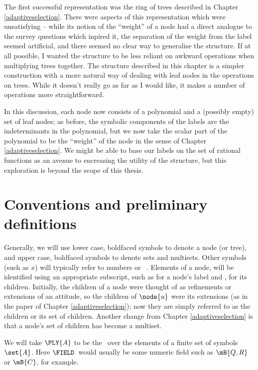 The first successful representation was the ring of trees described in
Chapter \ref{adaptiveselection}.  There were aspects of this
representation which were unsatisfying -- while its notion of the
``weight'' of a node had a direct analogue to the survey questions
which inpired it, the separation of the weight from the label seemed
artificial, and there seemed no clear way to generalise the
structure. If at all possible, I wanted the structure to be less
reliant on awkward operations when multiplying trees together.  The
structure described in this chapter is a simpler construction with a
more natural way of dealing with leaf nodes in the operations on
trees. While it doesn't really go as far as I would like, it makes a
number of operations more straightforward.

In this discussion, each node now consists of a polynomial and a
(possibly empty) set of leaf nodes; as before, the symbolic components
of the labels are the indeterminants in the polynomial, but we now
take the scalar part of the polynomial to be the ``weight'' of the
node in the sense of Chapter \ref{adaptiveselection}.  We might be
able to base our labels on the set of rational functions as an avenue
to encreasing the utility of the structure, but this exploration is
beyond the scope of this thesis. 

\section{Conventions and preliminary definitions}

Generally, we will use lower case, boldfaced symbols to denote a node
(or tree), and upper case, boldfaced symbols to denote sets and
multisets.  Other symbols (such as $x$) will typically refer to
numbers or \polyrat\ \polyforms. Elements of a node,  will be
identified using an appropriate subscript, such as  for a
node's label and , for its children. Initially, the children
of a node were thought of as refinements or extensions of an attitude,
so the children of $\node{u}$ were its extensions (as in the paper of
Chapter \ref{adaptiveselection}); now they are simply referred to as
the children or its set of children.  Another change from Chapter
\ref{adaptiveselection} is that a node's set of children has become a
multiset.

We will take $\PLY{A}$ to be the \polytypes\ over the elements of a finite set of
symbols $\set{A}$.  Here $\FIELD$\ would usually be some numeric field such as $\mB{Q,
  R}$ or $\mB{C}$, for example.

